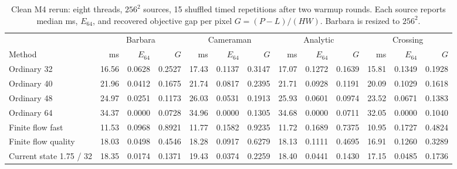 \begin{table}[t]\centering\scriptsize
\caption{Clean M4 rerun: eight threads, $256^2$ sources, 15 shuffled timed repetitions after two warmup rounds. Each source reports median ms, $E_{64}$, and recovered objective gap per pixel $G=(P-L)/(HW)$. Barbara is resized to $256^2$.}\label{tab:clean}
\begin{tabular}{lrrrrrrrrrrrr}\toprule
&\multicolumn{3}{c}{Barbara}&\multicolumn{3}{c}{Cameraman}&\multicolumn{3}{c}{Analytic}&\multicolumn{3}{c}{Crossing}\\
Method &ms & $E_{64}$ & $G$&ms & $E_{64}$ & $G$&ms & $E_{64}$ & $G$&ms & $E_{64}$ & $G$\\\midrule
Ordinary 32&16.56&0.0628&0.2527&17.43&0.1137&0.3147&17.07&0.1272&0.1639&15.81&0.1349&0.1928\\
Ordinary 40&21.96&0.0412&0.1675&21.74&0.0817&0.2395&21.71&0.0928&0.1191&20.09&0.1029&0.1618\\
Ordinary 48&24.97&0.0251&0.1173&26.03&0.0531&0.1913&25.93&0.0601&0.0974&23.52&0.0671&0.1383\\
Ordinary 64&34.37&0.0000&0.0728&34.96&0.0000&0.1305&34.68&0.0000&0.0711&32.05&0.0000&0.1040\\
Finite flow fast&11.53&0.0968&0.8921&11.77&0.1582&0.9235&11.72&0.1689&0.7375&10.95&0.1727&0.4824\\
Finite flow quality&18.03&0.0498&0.4546&18.28&0.0917&0.6279&18.13&0.1111&0.4695&16.91&0.1260&0.3289\\
Current state 1.75 / 32&18.35&0.0174&0.1371&19.43&0.0374&0.2259&18.40&0.0441&0.1430&17.15&0.0485&0.1736\\
\bottomrule\end{tabular}\end{table}
